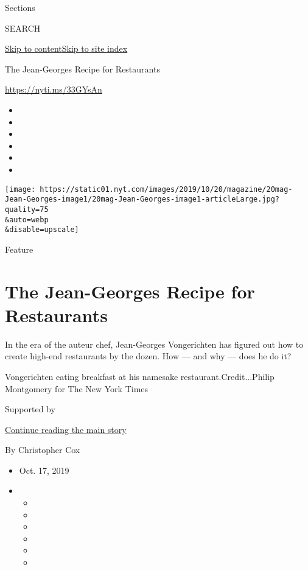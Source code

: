 Sections

SEARCH

\protect\hyperlink{site-content}{Skip to
content}\protect\hyperlink{site-index}{Skip to site index}

The Jean-Georges Recipe for Restaurants

\url{https://nyti.ms/33GYsAn}

\begin{itemize}
\item
\item
\item
\item
\item
\item
\end{itemize}

\texttt{[image: https://static01.nyt.com/images/2019/10/20/magazine/20mag-Jean-Georges-image1/20mag-Jean-Georges-image1-articleLarge.jpg?quality=75\\\&auto=webp\\\&disable=upscale]}

Feature

\hypertarget{the-jean-georges-recipe-for-restaurants}{%
\section{The Jean-Georges Recipe for
Restaurants}\label{the-jean-georges-recipe-for-restaurants}}

In the era of the auteur chef, Jean-Georges Vongerichten has figured out
how to create high-end restaurants by the dozen. How --- and why ---
does he do it?

Vongerichten eating breakfast at his namesake restaurant.Credit...Philip
Montgomery for The New York Times

Supported by

\protect\hyperlink{after-sponsor}{Continue reading the main story}

By Christopher Cox

\begin{itemize}
\item
  Oct. 17, 2019
\item
  \begin{itemize}
  \item
  \item
  \item
  \item
  \item
  \item
  \end{itemize}
\end{itemize}

